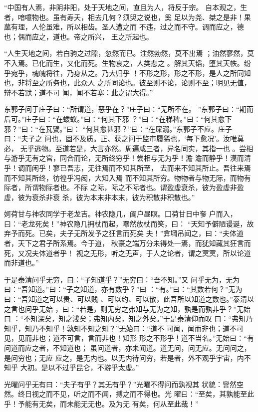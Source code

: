 \documentclass[a4paper,12pt,UTF8,twoside]{ctexbook}
\begin{document}
“中国有人焉，非阴非阳，处于天地之间，直且为人，将反于宗。 自本观之，生者，喑噫物也。虽有寿夭，相去几何？须臾之说也，奚 足以为尧、桀之是非！果蓏有理，人伦虽难，所以相齿。圣人遭之而 不违，过之而不守。调而应之，德也；偶而应之，道也。帝之所兴， 王之所起也。

“人生天地之间，若白驹之过隙，忽然而已。注然勃然，莫不出焉 ；油然寥然，莫不入焉。已化而生，又化而死。生物哀之，人类悲之 。解其天韬，堕其天帙。纷乎宛乎，魂魄将往，乃身从之。乃大归乎 ！不形之形，形之不形，是人之所同知也，非将至之所务也，此众人 之所同论也。彼至则不论，论则不至；明见无值，辩不若默；道不可 闻，闻不若塞：此之谓大得。”

东郭子问于庄子曰：“所谓道，恶乎在？”庄子曰：“无所不在。 ”东郭子曰：“期而后可。”庄子曰：“在蝼蚁。”曰：“何其下邪 ？”曰：“在稊稗。”曰：“何其愈下邪？”曰：“在瓦甓。”曰： “何其愈甚邪？”曰：“在屎溺。”东郭子不应。庄子曰：“夫子之 问也，固不及质。正、获之问于监市履狶也，‘每下愈况’。汝唯莫必， 无乎逃物。至道若是，大言亦然。周遍咸三者，异名同实，其指一也 。尝相与游乎无有之宫，同合而论，无所终穷乎！尝相与无为乎！澹 澹而静乎！漠而清乎！调而闲乎！寥已吾志，无往焉而不知其所至， 去而来不知其所止。吾往来焉而不知其所终，彷徨乎冯闳，大知入焉 而不知其所穷。物物者与物无际，而物有际者，所谓物际者也。不际 之际，际之不际者也。谓盈虚衰杀，彼为盈虚非盈虚，彼为衰杀非衰 杀，彼为本末非本末，彼为积散非积散也。”

妸荷甘与神农同学于老龙吉。神农隐几，阖户昼瞑。囗荷甘日中奓 户而入，曰：“老龙死矣！”神农隐几拥杖而起，嚗然放杖而笑，曰： “天知予僻陋谩诞，故弃予而死。已矣，夫子无所发予之狂言而死矣 夫！”弇堈吊闻之，曰：“夫体道者，天下之君子所系焉。今于道， 秋豪之端万分未得处一焉，而犹知藏其狂言而死，又况夫体道者乎！ 视之无形，听之无声，于人之论者，谓之冥冥，所以论道而非道也。”

于是泰清问乎无穷，曰：“子知道乎？”无穷曰：“吾不知。”又 问乎无为，无为曰：“吾知道。”曰：“子之知道，亦有数乎？”曰 ：“有。”曰：“其数若何？”无为曰：“吾知道之可以贵、可以贱 、可以约、可以散，此吾所以知道之数也。”泰清以之言也问乎无始 ，曰：“若是，则无穷之弗知与无为之知，孰是而孰非乎？”无始曰 ：“不知深矣，知之浅矣；弗知内矣，知之外矣。”于是泰清仰而叹 曰：“弗知乃知乎，知乃不知乎！孰知不知之知？”无始曰：“道不 可闻，闻而非也；道不可见，见而非也；道不可言，言而非也！知形 形之不形乎！道不当名。”无始曰：“有问道而应之者，不知道也； 虽问道者，亦未闻道。道无问，问无应。无问问之，是问穷也；无应 应之，是无内也。以无内待问穷，若是者，外不观乎宇宙，内不知乎 大初。是以不过乎昆仑，不游乎太虚。”

光曜问乎无有曰：“夫子有乎？其无有乎？”光曜不得问而孰视其 状貌：窨然空然。终日视之而不见，听之而不闻，搏之而不得也。光 曜曰：“至矣，其孰能至此乎！予能有无矣，而未能无无也。及为无 有矣，何从至此哉！”
\end{document}
